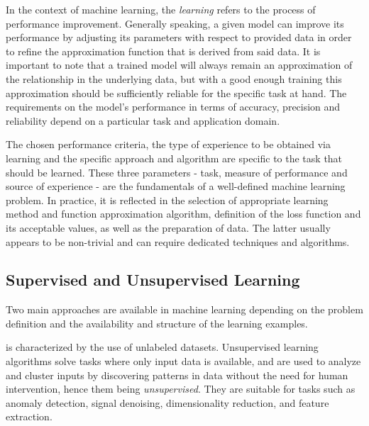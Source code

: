 In the context of machine learning, the \textit{learning} refers to the process of performance improvement.
Generally speaking, a given model can improve its performance by adjusting its parameters with respect to provided data in order to refine the approximation function that is derived from said data. 
It is important to note that a trained model will always remain an approximation of the relationship in the underlying data, but with a good enough training this approximation should be sufficiently reliable for the specific task at hand.
The requirements on the model's performance in terms of accuracy, precision and reliability depend on a particular task and application domain.

The chosen performance criteria, the type of experience to be obtained via learning and the specific approach and algorithm are specific to the task that should be learned.
These three parameters - task, measure of performance and source of experience - are the fundamentals of a well-defined machine learning problem.
In practice, it is reflected in the selection of appropriate learning method and function approximation algorithm, definition of the loss function and its acceptable values, as well as the preparation of data.
The latter usually appears to be non-trivial and can require dedicated techniques and algorithms. %

\subsection{Supervised and Unsupervised Learning}

Two main approaches are available in machine learning depending on the problem definition and the availability and structure of the learning examples.

 is characterized by the use of unlabeled datasets.
Unsupervised learning algorithms solve tasks where only input data is available, and are used to analyze and cluster inputs by discovering patterns in data without the need for human intervention, hence them being \textit{unsupervised}.
They are suitable for tasks such as anomaly detection, signal denoising, dimensionality reduction, and feature extraction.

